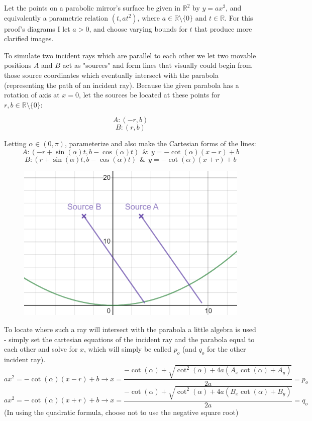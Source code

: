 \documentclass[10pt]{article}
\begin{document}
Let the points on a parabolic mirror's surface be given in $\mathbb{R}^2$ by $y=ax^2$, and equivalently a parametric relation $(t,at^2)$, where $a\in \mathbb{R}\setminus\{0\}$ and $t\in \mathbb{R}$. For this proof's diagrams I let $a>0$, and choose varying bounds for $t$ that produce more clarified images.

To simulate two incident rays which are parallel to each other we let two movable positions $A$ and $B$ act as "sources" and form lines that visually could begin from those source coordinates which eventually intersect with the parabola (representing the path of an incident ray). Because the given parabola has a rotation of axis at $x=0$, let the sources be located at these points for $r,b\in \mathbb{R}\setminus\{0\}$:

$$A:(-r,b)$$
$$B:(r,b)$$

Letting $\alpha\in (0,\pi)$, parameterize and also make the Cartesian forms of the lines:
$$A:\left(-r+\sin\left(\alpha\right)t,b-\cos\left(\alpha\right)t\right)~~ \&~~ y=-\cot\left(\alpha\right)\left(x-r\right)+b$$
$$B:\left(r+\sin\left(\alpha\right)t,b-\cos\left(\alpha\right)t\right)~~ \&~~ y=-\cot\left(\alpha\right)\left(x+r\right)+b$$

\begin{figure}[h]
\centering{}
\includegraphics[scale=0.4]{source}
\end{figure}

To locate where such a ray will intersect with the parabola a little algebra is used - simply set the cartesian equations of the incident ray and the parabola equal to each other and solve for $x$, which will simply be called $p_o$ (and $q_o$ for the other incident ray).
$$ax^2=-\cot\left(\alpha\right)\left(x-r\right)+b \to x=\frac{-\cot\left(\alpha\right)+\sqrt{\cot^{2}\left(\alpha\right)+4a\left(A_{x}\cot\left(\alpha\right)+A_{y}\right)}}{2a}=p_o$$
$$ax^2=-\cot\left(\alpha\right)\left(x+r\right)+b \to x=\frac{-\cot\left(\alpha\right)+\sqrt{\cot^{2}\left(\alpha\right)+4a\left(B_{x}\cot\left(\alpha\right)+B_{y}\right)}}{2a}=q_o$$
(In using the quadratic formula, choose not to use the negative square root)
\end{document}
